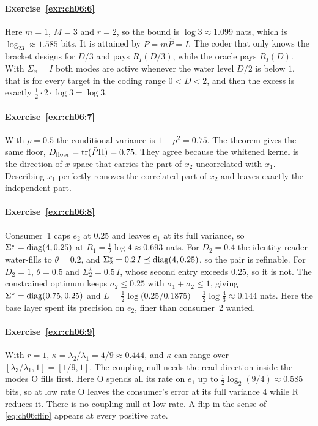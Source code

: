 \paragraph{Exercise~\ref{exr:ch06:6}}
Here $m=1$, $M=3$ and $r=2$, so the bound is $\log3\approx1.099$ nats, which is $\log_23\approx1.585$ bits. It is attained by $P=m\hat P=I$. The coder that only knows the bracket designs for $D/3$ and pays $R_I(D/3)$, while the oracle pays $R_I(D)$. With $\Sigma_x=I$ both modes are active whenever the water level $D/2$ is below $1$, that is for every target in the coding range $0<D<2$, and then the excess is exactly $\tfrac12\cdot2\cdot\log3=\log3$.

\paragraph{Exercise~\ref{exr:ch06:7}}
With $\rho=0.5$ the conditional variance is $1-\rho^2=0.75$. The theorem gives the same floor, $D_{\mathrm{floor}}=\operatorname{tr}(\tilde P\Pi)=0.75$. They agree because the whitened kernel is the direction of $x$-space that carries the part of $x_2$ uncorrelated with $x_1$. Describing $x_1$ perfectly removes the correlated part of $x_2$ and leaves exactly the independent part.

\paragraph{Exercise~\ref{exr:ch06:8}}
Consumer~1 caps $e_2$ at $0.25$ and leaves $e_1$ at its full variance, so $\Sigma_1^\star=\operatorname{diag}(4,0.25)$ at $R_1=\tfrac12\log4\approx0.693$ nats. For $D_2=0.4$ the identity reader water-fills to $\theta=0.2$, and $\Sigma_2^\star=0.2\,I\preceq\operatorname{diag}(4,0.25)$, so the pair is refinable. For $D_2=1$, $\theta=0.5$ and $\Sigma_2^\star=0.5\,I$, whose second entry exceeds $0.25$, so it is not. The constrained optimum keeps $\sigma_2\le0.25$ with $\sigma_1+\sigma_2\le1$, giving $\Sigma^\circ=\operatorname{diag}(0.75,0.25)$ and $L=\tfrac12\log\big(0.25/0.1875\big)=\tfrac12\log\tfrac43\approx0.144$ nats. Here the base layer spent its precision on $e_2$, finer than consumer~2 wanted.

\paragraph{Exercise~\ref{exr:ch06:9}}
With $r=1$, $\kappa=\lambda_2/\lambda_1=4/9\approx0.444$, and $\kappa$ can range over $[\lambda_3/\lambda_1,1]=[1/9,1]$. The coupling null needs the read direction inside the modes O fills first. Here O spends all its rate on $e_1$ up to $\tfrac12\log_2(9/4)\approx0.585$ bits, so at low rate O leaves the consumer's error at its full variance $4$ while R reduces it. There is no coupling null at low rate. A flip in the sense of \cref{eq:ch06:flip} appears at every positive rate.

